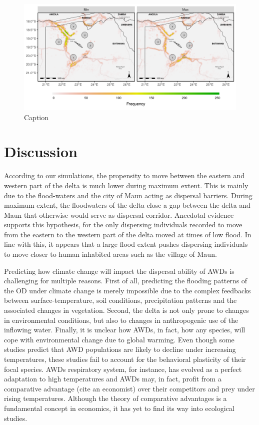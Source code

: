 \documentclass[abstract=on,10pt,a4paper,bibliography=totocnumbered]{article}
\begin{document}
\begin{figure}
  \begin{center}
  \includegraphics[width = \textwidth]{99_Distance.png}
  \caption{Caption}
  \label{Distance}
  \end{center}
\end{figure}

% 
% 
% 

\section{Discussion}
According to our simulations, the propensity to move between the eastern and
western part of the delta is much lower during maximum extent. This is mainly
due to the flood-waters and the city of Maun acting as dispersal barriers.
During maximum extent, the floodwaters of the delta close a gap between the
delta and Maun that otherwise would serve as dispersal corridor. Anecdotal
evidence supports this hypothesis, for the only dispersing individuals recorded
to move from the eastern to the western part of the delta moved at times of low
flood. In line with this, it appears that a large flood extent pushes dispersing
individuals to move closer to human inhabited areas such as the village of Maun.

Predicting how climate change will impact the dispersal ability of AWDs is
challenging for multiple reasons. First of all, predicting the flooding patterns
of the OD under climate change is merely impossible due to the complex feedbacks
between surface-temperature, soil conditions, precipitation patterns and the
associated changes in vegetation. Second, the delta is not only prone to changes
in environmental conditions, but also to changes in anthropogenic use of the
inflowing water. Finally, it is unclear how AWDs, in fact, how any
species, will cope with environmental change due to global warming. Even though
some studies predict that AWD populations are likely to decline under increasing
temperatures, these studies fail to account for the behavioral plasticity of
their focal species. AWDs respiratory system, for instance, has evolved as a
perfect adaptation to high temperatures and AWDs may, in fact, profit from a
comparative advantage (cite an economist) over their competitors and prey under
rising temperatures. Although the theory of comparative advantages is a
fundamental concept in economics, it has yet to find its way into ecological
studies.
\end{document}
